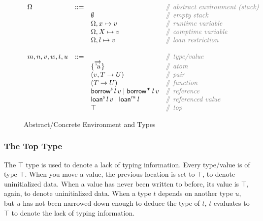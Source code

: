 \documentclass[12pt,twoside]{report}
\begin{document}
\begin{figure}[H]
  \arraycolsep=1pt %
  \centering

  \vspace{-2ex} %
  \[
  \begin{array}[t]{llll}
    \Omega & ::= & & \ocomment{abstract environment (stack)} \\
    && \emptyset & \ocomment{empty stack} \\
    && \Omega, x \mapsto v & \ocomment{runtime variable} \\
    && \Omega, X \mapsto v & \ocomment{comptime variable} \\
    && \Omega, l \mapsto v & \ocomment{loan restriction} \\
    \\
    m, n, v, w, t, u & ::= & & \ocomment{type/value} \\
    && \{\overrightarrow{\atom{a}}\} & \ocomment{atom} \\
    && (v, T \rightarrow U) & \ocomment{pair} \\
    && (T \rightarrow U) & \ocomment{function} \\
    && \borrows{l}{v} \mid \borrowm{l}{v} & \ocomment{reference} \\
    && \loans{l}{v} \mid \loanm{l} & \ocomment{referenced value} \\
    && \top & \ocomment{top} \\
  \end{array} %
  \]
\caption{Abstract/Concrete Environment and Types} %
\label{fig:env} %
\end{figure} %

\subsubsection{The Top Type}
The $\top$ type is used to denote a lack of typing information. Every type/value is of type $\top$. When you move a value, the previous location is set to $\top$, to denote uninitialized data. When a value has never been written to before, its value is $\top$, again, to denote uninitialized data. When a type $t$ depends on another type $u$, but $u$ has not been narrowed down enough to deduce the type of $t$, $t$ evaluates to $\top$ to denote the lack of typing information.
\end{document}
